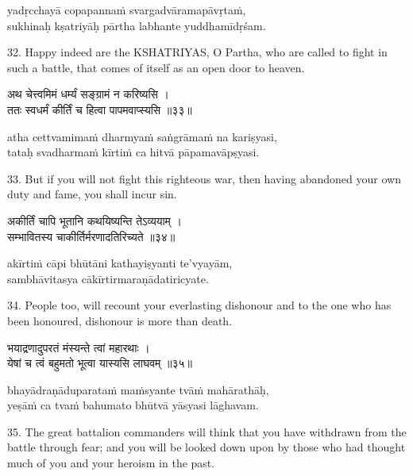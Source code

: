 \begin{transliteration}
yadṛcchayā copapannaṁ svargadvāramapāvṛtaṁ, \\
sukhinaḥ kṣatriyāḥ pārtha labhante yuddhamīdṛśam.
\end{transliteration}

32. Happy indeed are the KSHATRIYAS, O Partha, who are called to fight in such
a battle, that comes of itself as an open door to heaven.

\begin{gitaverse}
अथ चेत्त्वमिमं धर्म्यं सङ्ग्रामं न करिष्यसि । \\
ततः स्वधर्मं कीर्तिं च हित्वा पापमवाप्स्यसि ॥३३॥
\end{gitaverse}

\begin{transliteration}
atha cettvamimaṁ dharmyaṁ saṅgrāmaṁ na kariṣyasi, \\
tataḥ svadharmaṁ kīrtiṁ ca hitvā pāpamavāpṣyasi.
\end{transliteration}

33. But if you will not fight this righteous war, then having abandoned your
own duty and fame, you shall incur sin.

\begin{gitaverse}
अकीर्तिं चापि भूतानि कथयिष्यन्ति तेऽव्ययाम् । \\
सम्भावितस्य चाकीर्तिर्मरणादतिरिच्यते ॥३४॥
\end{gitaverse}

\begin{transliteration}
akīrtiṁ cāpi bhūtāni kathayiṣyanti te'vyayām, \\
sambhāvitasya cākīrtirmaraṇādatiricyate.
\end{transliteration}

34. People too, will recount your everlasting dishonour and to the one who has
been honoured, dishonour is more than death.

\begin{gitaverse}
भयाद्रणादुपरतं मंस्यन्ते त्वां महारथाः । \\
येषां च त्वं बहुमतो भूत्वा यास्यसि लाघवम् ॥३५॥
\end{gitaverse}

\begin{transliteration}
bhayādraṇāduparataṁ maṁsyante tvāṁ mahārathāḥ, \\
yeṣāṁ ca tvaṁ bahumato bhūtvā yāsyasi lāghavam.
\end{transliteration}

35. The great battalion commanders will think that you have withdrawn from the
battle through fear; and you will be looked down upon by those who had thought
much of you and your heroism in the past.


